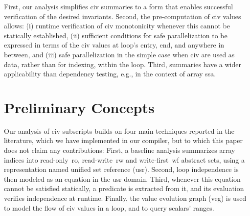 \documentclass{sig-alternate}
\begin{document}
First, our analysis simplifies {\sc civ} summaries to a form 
that enables successful verification of the desired invariants. 
Second, the pre-computation of {\sc civ} values allows:
  (i) runtime verification of {\sc civ} monotonicity whenever 
          this cannot be statically established, 
 (ii) sufficient conditions for safe parallelization to 
          be expressed in terms of the {\sc civ} values at loop's 
          entry, end, and anywhere in between, and 
(iii) safe parallelization in the simple case when
        {\sc civ} are used as data, rather than for indexing,
        within the loop.
Third, summaries have a wider applicability than dependency testing,
e.g., in the context of array {\sc ssa}.






\section{Preliminary Concepts}
\label{subsec:Background}

\enlargethispage{\baselineskip}

Our analysis of {\sc civ} subscripts builds on four main techniques 
reported in the literature, which we have implemented 
in our compiler, but to which this paper does not claim any contributions:
%
First, a baseline analysis summarizes array indices into read-only~{\sc ro}, 
read-write~{\sc rw} and write-first~{\sc wf} abstract sets, using a 
representation named unified set reference ({\sc usr}).
%
Second, loop independence is then modeled as an equation in the 
{\sc usr} domain. 
%
Third, whenever this equation cannot be satisfied statically, a 
predicate is extracted from it, and its evaluation verifies independence 
at runtime. 
%
Finally, the value evolution graph ({\sc veg}) is used to model the 
flow of {\sc civ} values in a loop, and to query scalars' ranges.
\end{document}
